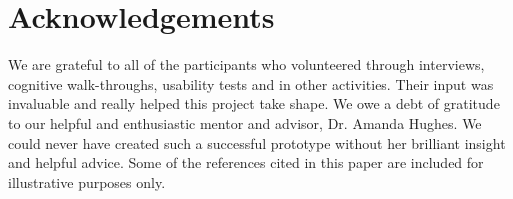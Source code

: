 \documentclass{sigchi-ext}
\begin{document}
\section{Acknowledgements}

We are grateful to all of the participants who
volunteered through interviews, cognitive walk-throughs, usability tests and in
other activities. Their input was invaluable and really helped this project
take shape.  We owe a debt of gratitude to our helpful and enthusiastic mentor
and advisor, Dr. Amanda Hughes. We could never have created such a successful
prototype without her brilliant insight and helpful advice.  Some of the
references cited in this paper are included for illustrative purposes only.



\balance{}

% 

% 

\end{document}
